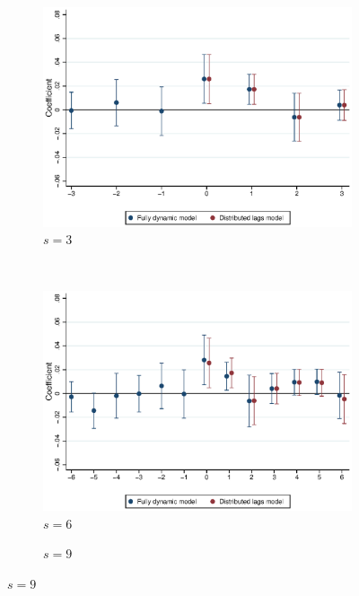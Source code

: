 \clearpage
\begin{figure}[htb!]
	\caption{Dynamic coefficients for different window $s$}
	\label{fig:dynamic_change_window}
	\centering
	\begin{subfigure}[b]{0.5\textwidth}
		\caption{$s=3$}
		\includegraphics[width = .92\textwidth]
		{../../analysis/first_differences/output/fd_models_coeffs_w3.eps}
	\end{subfigure}\\
	\begin{subfigure}[b]{0.5\textwidth}
		\caption{$s=6$}
		\includegraphics[width = .985\textwidth]
		{../../analysis/first_differences/output/fd_models_coeffs_w6.eps}
	\end{subfigure}%
	\begin{subfigure}[b]{0.5\textwidth}
		\caption{$s=9$}

\end{subfigure}
\end{figure}
